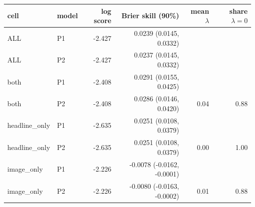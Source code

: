 \begin{tabular}{llrrrr}
\toprule
cell & model & log score & Brier skill (90\%) & mean $\lambda$ & share $\lambda=0$ \\
\midrule
ALL & P1 & -2.427 & 0.0239 (0.0145, 0.0332) &  &  \\
ALL & P2 & -2.427 & 0.0237 (0.0145, 0.0332) &  &  \\
both & P1 & -2.408 & 0.0291 (0.0155, 0.0425) &  &  \\
both & P2 & -2.408 & 0.0286 (0.0146, 0.0420) & 0.04 & 0.88 \\
headline\_only & P1 & -2.635 & 0.0251 (0.0108, 0.0379) &  &  \\
headline\_only & P2 & -2.635 & 0.0251 (0.0108, 0.0379) & 0.00 & 1.00 \\
image\_only & P1 & -2.226 & -0.0078 (-0.0162, -0.0001) &  &  \\
image\_only & P2 & -2.226 & -0.0080 (-0.0163, -0.0002) & 0.01 & 0.88 \\
\bottomrule
\end{tabular}
